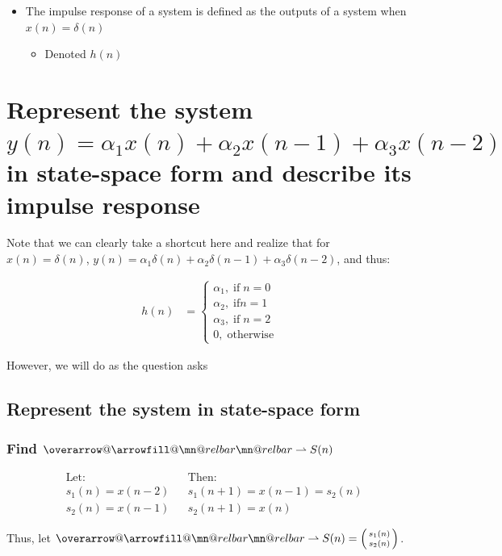 \documentclass{article}
\makeatletter
\renewcommand{\thesubsection}{\thesection.\alph{subsection}}
\renewcommand{\thesubsubsection}{\thesection.\alph{subsection}.\Roman{subsubsection}}
\DeclareRobustCommand{\overrightharpoon}{\mathpalette{\overarrow@\rightharpoonfill@}}
\def\rightharpoonfill@{\arrowfill@\mn@relbar\mn@relbar\rightharpoonup}
\makeatother
\begin{document}
\begin{itemize}
	\item The impulse response of a system is defined as the outputs of a system when $x(n) = \delta(n)$
	\begin{itemize}
		\item Denoted $h(n)$
	\end{itemize}
\end{itemize}

\section[Example ~\thesection]{Represent the system $y(n) = {\alpha_1}x(n) + {\alpha_2}x(n - 1) + {\alpha_3}x(n - 2)$ in state-space form and describe its impulse response}

Note that we can clearly take a shortcut here and realize that for $x(n) = \delta(n)$, $y(n) = {\alpha_1}\delta(n) + {\alpha_2}\delta(n - 1) + {\alpha_3}\delta(n - 2)$, and thus:

\begin{align*}
	h(n) &= \begin{cases} \alpha_1, \; \text{if} \; n = 0 \\ \alpha_2, \; \text{if} n = 1 \\ \alpha_3, \; \text{if} \; n = 2 \\ 0, \; \text{otherwise} \end{cases}
\end{align*}

However, we will do as the question asks

\subsection[~\thesubsection]{Represent the system in state-space form}

\subsubsection[~\thesubsubsection]{Find $\overrightharpoon{S(n)}$}

\begin{align*}
	&\text{Let:}& &\text{Then:} \\
	&s_1(n) = x(n - 2) & &s_1(n + 1) = x(n - 1) = s_2(n) \\
	&s_2(n) = x(n - 1) & &s_2(n + 1) = x(n)
\end{align*}

Thus, let $\overrightharpoon{S(n)} = \begin{psmallmatrix} s_1(n) \\ s_2(n) \end{psmallmatrix}$.
\end{document}
